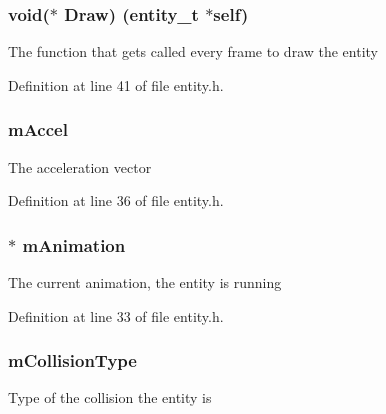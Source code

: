 \subsubsection[{\texorpdfstring{Draw}{Draw}}]{\setlength{\rightskip}{0pt plus 5cm}void($\ast$ Draw) ({\bf entity\+\_\+t} $\ast$self)}\hypertarget{structentity__s_a51719e3ab7c4f8dd260dea013021f53c}{}\label{structentity__s_a51719e3ab7c4f8dd260dea013021f53c}
The function that gets called every frame to draw the entity 

Definition at line 41 of file entity.\+h.

\subsubsection[{\texorpdfstring{m\+Accel}{mAccel}}]{ m\+Accel}\hypertarget{structentity__s_ae9f3b8e36df4503009ee071958f75b6c}{}\label{structentity__s_ae9f3b8e36df4503009ee071958f75b6c}
The acceleration vector 

Definition at line 36 of file entity.\+h.

\subsubsection[{\texorpdfstring{m\+Animation}{mAnimation}}]{$\ast$ m\+Animation}\hypertarget{structentity__s_ab8851adbf3f67db41bcdac86f698b197}{}\label{structentity__s_ab8851adbf3f67db41bcdac86f698b197}
The current animation, the entity is running 

Definition at line 33 of file entity.\+h.

\subsubsection[{\texorpdfstring{m\+Collision\+Type}{mCollisionType}}]{ m\+Collision\+Type}\hypertarget{structentity__s_afe71918d74f1053c28126544dce2f32b}{}\label{structentity__s_afe71918d74f1053c28126544dce2f32b}
Type of the collision the entity is 

